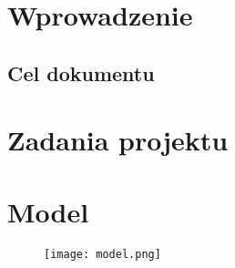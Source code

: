 


\tableofcontents
\clearpage
\section{Wprowadzenie}
\subsection{Cel dokumentu}
\clearpage
\section{Zadania projektu}
\section{Model}
\begin{figure}
  \texttt{[image: model.png]}
\end{figure}

